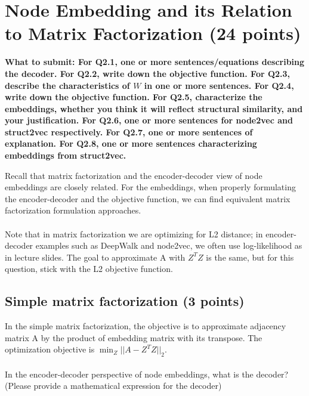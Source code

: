 \documentclass{article}
\numberwithin{figure}{section}
\begin{document}
	
	
	\section{Node Embedding and its Relation to Matrix Factorization (24 points)}
	
	\textbf{ What to submit: For Q2.1, one or more sentences/equations describing the decoder. For Q2.2, write down the objective function. For Q2.3, describe the characteristics of $W$ in one or more sentences. For Q2.4, write down the objective function. For Q2.5, characterize the embeddings, whether you think it will reflect structural similarity, and your justification. For Q2.6, one or more sentences for node2vec and struct2vec respectively. For Q2.7, one or more sentences of explanation. For Q2.8, one or more sentences characterizing embeddings from struct2vec.}
	
	Recall that matrix factorization and the encoder-decoder view of node embeddings are closely related. For the embeddings, when properly formulating the encoder-decoder and the objective function, we can find equivalent matrix factorization formulation approaches.\\
	\\
	Note that in matrix factorization we are optimizing for L2 distance; in encoder-decoder examples such as DeepWalk and node2vec, we often use log-likelihood as in lecture slides. The goal to approximate A with $Z^TZ$ is the same, but for this question, stick with the L2 objective function.
	\subsection{Simple matrix factorization (3 points)}
	In the simple matrix factorization, the objective is to approximate adjacency matrix A by the product of embedding matrix with its transpose. The optimization objective is $\min_Z ||A - Z^TZ||_2$.\\
	\\
	In the encoder-decoder perspective of node embeddings, what is the decoder? (Please provide a mathematical expression for the decoder)
	
\end{document}
